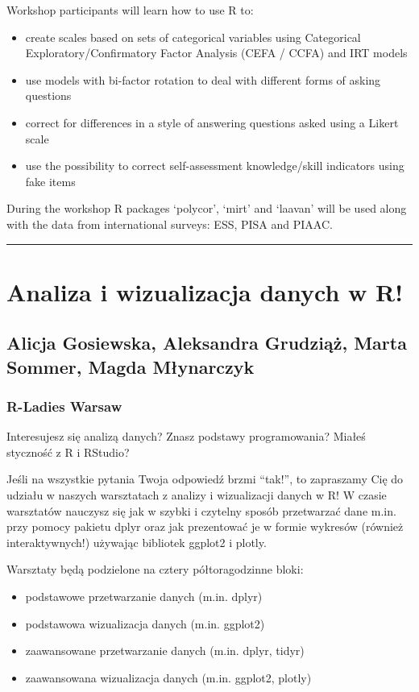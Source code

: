 \documentclass [12pt]{article}
\begin{document}
Workshop participants will learn how to use R to:
\begin{itemize}
\setlength\itemsep{.15em}
\item create scales based on sets of categorical variables using Categorical Exploratory/Confirmatory Factor Analysis (CEFA / CCFA) and IRT models
\item use models with bi-factor rotation to deal with different forms of asking questions
\item correct for differences in a style of answering questions asked using a Likert scale
\item use the possibility to correct self-assessment knowledge/skill indicators using fake items
\end{itemize}

During the workshop R packages ‘polycor’, ‘mirt’ and ‘laavan’ will be used along with the data from international surveys: ESS, PISA and PIAAC.

\noindent\rule{\textwidth}{1pt}
\section{Analiza i wizualizacja danych w R!}
\subsection*{Alicja Gosiewska, Aleksandra Grudziąż, Marta Sommer, Magda Młynarczyk}
\subsubsection*{R-Ladies Warsaw}

Interesujesz się analizą danych? Znasz podstawy programowania? Miałeś styczność z R i RStudio?

Jeśli na wszystkie pytania Twoja odpowiedź brzmi “tak!”, to zapraszamy Cię do udziału w naszych warsztatach z analizy i wizualizacji danych w R! W czasie warsztatów nauczysz się jak w szybki i czytelny sposób przetwarzać dane m.in. przy pomocy pakietu dplyr oraz jak prezentować je w formie wykresów (również interaktywnych!) używając bibliotek ggplot2 i plotly.

Warsztaty będą podzielone na cztery półtoragodzinne bloki:
\begin{itemize}
\setlength\itemsep{.15em}
\item podstawowe przetwarzanie danych (m.in. dplyr)
\item podstawowa wizualizacja danych (m.in. ggplot2)
\item zaawansowane przetwarzanie danych (m.in. dplyr, tidyr)
\item zaawansowana wizualizacja danych (m.in. ggplot2, plotly)
\end{itemize}
\newpage
{}
\end{document}
